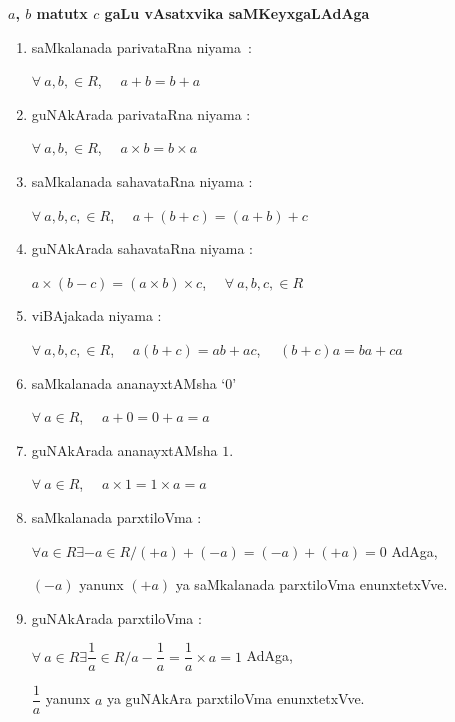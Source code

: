 {\bf \boldmath$a$, $b$ matutx $c$ gaLu vAsatxvika saMKeyxgaLAdAga}
\begin{enumerate}
\renewcommand{\labelenumi}{\eng{\theenumi.}}
\item saMkalanada parivataRna niyama~:


$\forall \ a,b,\in R$, \ \ $a+b=b+a$

\item guNAkArada parivataRna niyama :


$\forall \ a,b,\in R$, \ \ $a\times b=b\times a$

\item saMkalanada sahavataRna niyama :


$\forall \ a,b,c,\in R$, \ \ $a+(b+c)=(a+b)+c$

\item guNAkArada sahavataRna niyama :


$a\times (b-c)=(a\times b)\times c$, \ \ $\forall \ a,b,c,\in R$

\item viBAjakada niyama :


$\forall \ a,b,c,\in R$,  \ \ $a(b+c)=ab+ac$, \ \ $(b+c)a=ba+ca$

\item saMkalanada ananayxtAMsha `$0$'


$\forall \ a\in R$, \ \ $a+0=0+a=a$

\item guNAkArada ananayxtAMsha $1$.


$\forall \ a\in R$, \ \ $a\times 1= 1\times a=a$

\item saMkalanada parxtiloVma :


$\forall a\in R\exists - a\in R/(+a)+(-a)=(-a)+(+a)=0$ AdAga, 

$(-a)$ yanunx $(+a)$ ya saMkalanada parxtiloVma enunxtetxVve.

\item guNAkArada parxtiloVma :


$\forall \ a\in R\exists \dfrac{1}{a}\in R/ a -\dfrac{1}{a}=\dfrac{1}{a}\times a=1$ AdAga, 

$\dfrac{1}{a}$ yanunx $a$ ya guNAkAra parxtiloVma enunxtetxVve.
\end{enumerate}


